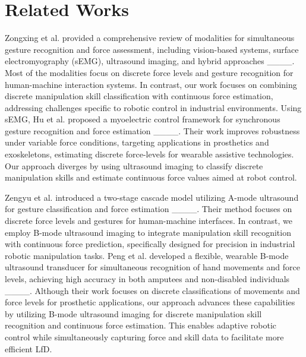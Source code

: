 \section{Related Works}
Zongxing et al. provided a comprehensive review of modalities for simultaneous gesture recognition and force assessment, including vision-based systems, surface electromyography (sEMG), ultrasound imaging, and hybrid approaches ____. Most of the modalities focus on discrete force levels and gesture recognition for human-machine interaction systems. In contrast, our work focuses on combining discrete manipulation skill classification with continuous force estimation, addressing challenges specific to robotic control in industrial environments. Using sEMG, Hu et al. proposed a myoelectric control framework for synchronous gesture recognition and force estimation ____. Their work improves robustness under variable force conditions, targeting applications in prosthetics and exoskeletons, estimating discrete force-levels for wearable assistive technologies. Our approach diverges by using ultrasound imaging to classify discrete manipulation skills and estimate continuous force values aimed at robot control. 

Zengyu et al. introduced a two-stage cascade model utilizing A-mode ultrasound for gesture classification and force estimation ____. Their method focuses on discrete force levels and gestures for human-machine interfaces. In contrast, we employ B-mode ultrasound imaging to integrate manipulation skill recognition with continuous force prediction, specifically designed for precision in industrial robotic manipulation tasks. Peng et al. developed a flexible, wearable B-mode ultrasound transducer for simultaneous recognition of hand movements and force levels, achieving high accuracy in both amputees and non-disabled individuals ____. Although their work focuses on discrete classifications of movements and force levels for prosthetic applications, our approach advances these capabilities by utilizing B-mode ultrasound imaging for discrete manipulation skill recognition and continuous force estimation. This enables adaptive robotic control while simultaneously capturing force and skill data to facilitate more efficient LfD.